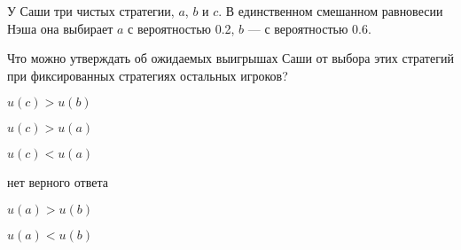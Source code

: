 
\begin{question}
У Саши три чистых стратегии, \(a\), \(b\) и \(c\). В единственном
смешанном равновесии Нэша она выбирает \(a\) с вероятностью 0.2, \(b\)
--- с вероятностью 0.6.

Что можно утверждать об ожидаемых выигрышах Саши от выбора этих
стратегий при фиксированных стратегиях остальных игроков?
\begin{answerlist}
  \item \(u(c) > u(b)\)
  \item \(u(c) > u(a)\)
  \item \(u(c) < u(a)\)
  \item нет верного ответа
  \item \(u(a) > u(b)\)
  \item \(u(a) < u(b)\)
\end{answerlist}
\end{question}


